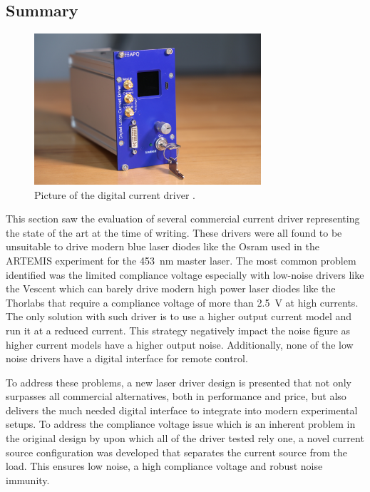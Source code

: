 \subsection{Summary}%
\label{sec_dgDrive_summary}
\begin{figure}[h]
    \centering
    \includegraphics[width=0.75\textwidth]{images/BM1A6451_dgDrive_lowres.JPG}
    \caption{Picture of the digital current driver .}
\end{figure}

This section saw the evaluation of several commercial current driver representing the state of the art at the time of writing. These drivers were all found to be unsuitable to drive modern blue laser diodes like the Osram  \cite{datasheet_osram_pl450b} used in the ARTEMIS experiment for the \qty{453}{\nm} master laser. The most common problem identified was the limited compliance voltage especially with low-noise drivers like the Vescent  which can barely drive modern high power laser diodes like the Thorlabs  \cite{datasheet_thorlabs_780nm} that require a compliance voltage of more than \qty{2.5}{\V} at high currents. The only solution with such driver is to use a higher output current model and run it at a reduced current. This strategy negatively impact the noise figure as higher current models have a higher output noise. Additionally, none of the low noise drivers have a digital interface for remote control.

To address these problems, a new laser driver design is presented that not only surpasses all commercial alternatives, both in performance and price, but also delivers the much needed digital interface to integrate into modern experimental setups. To address the compliance voltage issue which is an inherent problem in the original design by \citeauthor{libbrecht_hall} \cite{libbrecht_hall} upon which all of the driver tested rely one, a novel current source configuration was developed that separates the current source from the load. This ensures low noise, a high compliance voltage and robust noise immunity.

